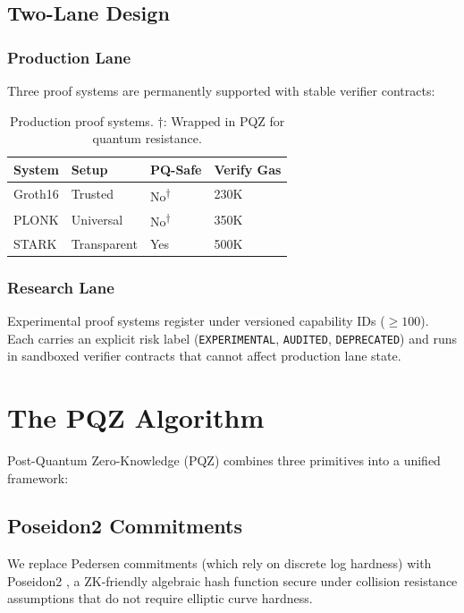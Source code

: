 \documentclass[11pt,a4paper]{article}
\begin{document}
\subsection{Two-Lane Design}

\subsubsection{Production Lane}

Three proof systems are permanently supported with stable verifier contracts:

\begin{table}[h]
\centering
\begin{tabular}{llll}
\toprule
\textbf{System} & \textbf{Setup} & \textbf{PQ-Safe} & \textbf{Verify Gas} \\
\midrule
Groth16 & Trusted & No\textsuperscript{$\dagger$} & 230K \\
PLONK & Universal & No\textsuperscript{$\dagger$} & 350K \\
STARK & Transparent & Yes & 500K \\
\bottomrule
\end{tabular}
\caption{Production proof systems. $\dagger$: Wrapped in PQZ for quantum resistance.}
\end{table}

\subsubsection{Research Lane}

Experimental proof systems register under versioned capability IDs ($\geq 100$). Each carries an explicit risk label (\texttt{EXPERIMENTAL}, \texttt{AUDITED}, \texttt{DEPRECATED}) and runs in sandboxed verifier contracts that cannot affect production lane state.

\section{The PQZ Algorithm}

Post-Quantum Zero-Knowledge (PQZ) combines three primitives into a unified framework:

\subsection{Poseidon2 Commitments}

We replace Pedersen commitments (which rely on discrete log hardness) with Poseidon2 \cite{grassi2023poseidon2}, a ZK-friendly algebraic hash function secure under collision resistance assumptions that do not require elliptic curve hardness.
\end{document}
